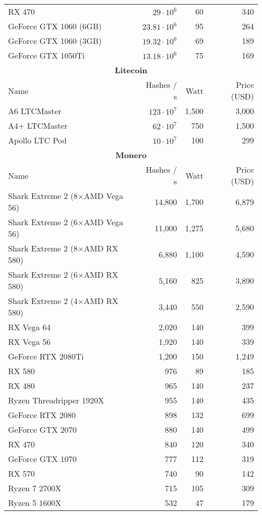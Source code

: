 \begin{longtable}{|p{}|r|r|r|}
  RX 470 & $29 \cdot 10^{6}$ & 60 & 340 \\
  GeForce GTX 1060 (6GB) & $23.81 \cdot 10^{6}$ & 95 & 264 \\
  GeForce GTX 1060 (3GB) & $19.32 \cdot 10^{6}$ & 69 & 189 \\
  GeForce GTX 1050Ti & $13.18 \cdot 10^{6}$ & 75 & 169 \\
  \hline
  \multicolumn{4}{|c|}{\textbf{Litecoin}} \\
  \hline
  Name & Hashes / s & Watt & Price (USD) \\
  \hhline{|=|=|=|=|}
  A6 LTCMaster & $123 \cdot 10^{7}$ & 1,500 & 3,000 \\
  A4+ LTCMaster & $62 \cdot 10^{7}$ & 750 & 1,500 \\
  Apollo LTC Pod & $10 \cdot 10^{7}$ & 100 & 299 \\
  \hline
  \hline
  \multicolumn{4}{|c|}{\textbf{Monero}} \\
  \hline
  Name & Hashes / s & Watt & Price (USD) \\
  \hhline{|=|=|=|=|}
  Shark Extreme 2 (8$ \times $AMD Vega 56) & 14,800 & 1,700 & 6,879 \\
  Shark Extreme 2 (6$ \times $AMD Vega 56) & 11,000 & 1,275 & 5,680 \\
  Shark Extreme 2 (8$ \times $AMD RX 580) & 6,880 & 1,100 & 4,590 \\
  Shark Extreme 2 (6$ \times $AMD RX 580) & 5,160 & 825 & 3,890 \\
  Shark Extreme 2 (4$ \times $AMD RX 580) & 3,440 & 550 & 2,590 \\
  RX Vega 64 & 2,020 & 140 & 399 \\
  RX Vega 56 & 1,920 & 140 & 339 \\
  GeForce RTX 2080Ti & 1,200 & 150 & 1,249 \\
  RX 580 & 976 & 89 & 185 \\
  RX 480 & 965 & 140 & 237 \\
  Ryzen Threadripper 1920X & 955 & 140 & 435 \\
  GeForce RTX 2080 & 898 & 132 & 699 \\
  GeForce GTX 2070 & 880 & 140 & 499 \\
  RX 470 & 840 & 120 & 340 \\
  GeForce GTX 1070 & 777 & 112 & 319 \\
  RX 570 & 740 & 90 & 142 \\
  Ryzen 7 2700X & 715 & 105 & 309 \\
  Ryzen 5 1600X & 532 & 47 & 179 \\

\end{longtable}
